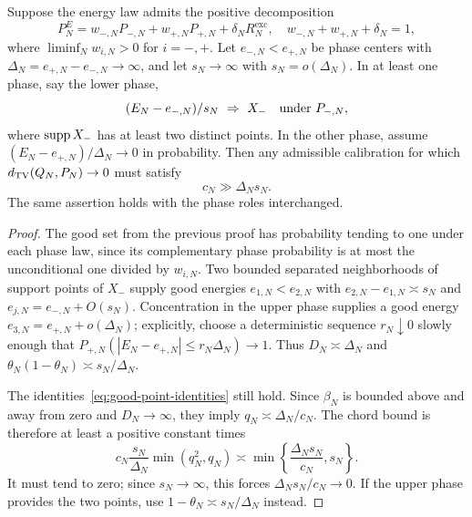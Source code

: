 \begin{theorem}
\label{thm:two-scale-necessity}
Suppose the energy law admits the positive decomposition
\begin{equation}
 P_N^E=w_{-,N}P_{-,N}+w_{+,N}P_{+,N}+\delta_N R_N^{\mathrm{exc}},
 \quad w_{-,N}+w_{+,N}+\delta_N=1,
 \label{eq:positive-decomposition}
\end{equation}
where $\liminf_N w_{i,N}>0$ for $i=-,+$. Let $e_{-,N}<e_{+,N}$ be
phase centers with $\Delta_N=e_{+,N}-e_{-,N}\to\infty$, and let
$s_N\to\infty$ with $s_N=o(\Delta_N)$. In at least one phase, say
the lower phase,
\begin{equation}
 (E_N-e_{-,N})/s_N\ \Rightarrow\ X_-
 \quad\hbox{under }P_{-,N},
 \label{eq:one-phase-weak-limit}
\end{equation}
where $\operatorname{supp} X_-$ has at least two distinct points. In the other phase,
assume $(E_N-e_{+,N})/\Delta_N\to0$ in probability. Then any admissible
calibration for which $d_{\mathrm{TV}}(Q_N,P_N)\to0$ must satisfy
\begin{equation}
 c_N\gg\Delta_Ns_N.
 \label{eq:two-scale-necessity}
\end{equation}
The same assertion holds with the phase roles interchanged.
\end{theorem}
\begin{proof}
The good set from the previous proof has probability tending to one
under each phase law, since its complementary phase probability is
at most the unconditional one divided by $w_{i,N}$.
Two bounded separated neighborhoods of support points of $X_-$
supply good energies $e_{1,N}<e_{2,N}$ with
$e_{2,N}-e_{1,N}\asymp s_N$ and $e_{j,N}=e_{-,N}+O(s_N)$.
Concentration in the upper phase supplies a good energy
$e_{3,N}=e_{+,N}+o(\Delta_N)$; explicitly, choose a deterministic
sequence $r_N\downarrow0$ slowly enough that
$P_{+,N}(|E_N-e_{+,N}|\le r_N\Delta_N)\to1$.
Thus $D_N\asymp\Delta_N$ and
$\theta_N(1-\theta_N)\asymp s_N/\Delta_N$.

The identities~\eqref{eq:good-point-identities} still hold. Since
$\beta_N$ is bounded above and away from zero and $D_N\to\infty$,
they imply $q_N\asymp\Delta_N/c_N$. The chord bound is therefore at
least a positive constant times
\[
 c_N\frac{s_N}{\Delta_N}\min(q_N^2,q_N)
 \asymp\min\left\{\frac{\Delta_Ns_N}{c_N},s_N\right\}.
\]
It must tend to zero; since $s_N\to\infty$, this forces
$\Delta_Ns_N/c_N\to0$. If the upper phase provides the two points,
use $1-\theta_N\asymp s_N/\Delta_N$ instead.
\end{proof}

